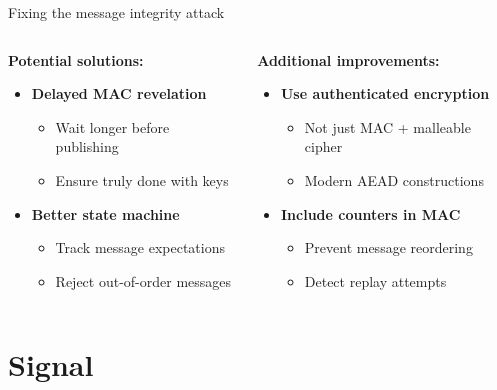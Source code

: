 \documentclass[aspectratio=169, lualatex, handout]{beamer}
\begin{document}
\begin{frame}{Fixing the message integrity attack}
	\begin{columns}
		\begin{column}{0.5\textwidth}
			\textbf{Potential solutions:}
			\begin{itemize}
				\item \textbf{Delayed MAC revelation}
				      \begin{itemize}
					      \item Wait longer before publishing
					      \item Ensure truly done with keys
				      \end{itemize}
				\item \textbf{Better state machine}
				      \begin{itemize}
					      \item Track message expectations
					      \item Reject out-of-order messages
				      \end{itemize}
			\end{itemize}
		\end{column}
		\begin{column}{0.5\textwidth}
			\textbf{Additional improvements:}
			\begin{itemize}
				\item \textbf{Use authenticated encryption}
				      \begin{itemize}
					      \item Not just MAC + malleable cipher
					      \item Modern AEAD constructions
				      \end{itemize}
				\item \textbf{Include counters in MAC}
				      \begin{itemize}
					      \item Prevent message reordering
					      \item Detect replay attempts
				      \end{itemize}
			\end{itemize}
		\end{column}
	\end{columns}
\end{frame}

\section{Signal}
\end{document}
